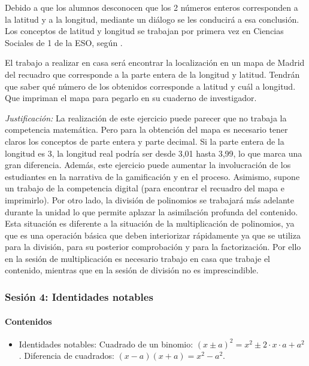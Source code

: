 Debido a que los alumnos desconocen que los 2 números enteros corresponden a la latitud y a la longitud, mediante un diálogo se les conducirá a esa conclusión.
%
Los conceptos de latitud y longitud se trabajan por primera vez en Ciencias Sociales de 1 de la ESO, según \bocm.


El trabajo a realizar en casa será encontrar la localización en un mapa de Madrid del recuadro que corresponde a la parte entera de la longitud y latitud.
%
Tendrán que saber qué número de los obtenidos corresponde a latitud y cuál a longitud.
%
Que impriman el mapa para pegarlo en su cuaderno de investigador.

\textit{
	Justificación:
}
%
La realización de este ejercicio puede parecer que no trabaja la competencia matemática. 
%
Pero para la obtención del mapa es necesario tener claros los conceptos de parte entera y parte decimal.
%
Si la parte entera de la longitud es 3, la longitud real podría ser desde 3,01 hasta 3,99, lo que marca una gran diferencia.
%
Además, este ejercicio puede aumentar la involucración de los estudiantes en la narrativa de la gamificación y en el proceso.
%
Asimismo, supone un trabajo de la competencia digital (para encontrar el recuadro del mapa e imprimirlo).
%
Por otro lado, la división de polinomios se trabajará más adelante durante la unidad lo que permite aplazar la asimilación profunda del contenido.
%
Esta situación es diferente a la situación de la multiplicación de polinomios, ya que es una operación básica que deben interiorizar rápidamente ya que se utiliza para la división, para su posterior comprobación y para la factorización.
%
Por ello en la sesión de multiplicación es necesario trabajo en casa que trabaje el contenido, mientras que en la sesión de división no es imprescindible.



\subsubsection{Sesión 4: Identidades notables}

\paragraph{Contenidos}
\begin{itemize}
	\item Identidades notables: 
	\subitem Cuadrado de un binomio: $(x\pm a)^2 = x^2\pm 2·x·a + a^2$.
	\subitem Diferencia de cuadrados: $(x-a)(x+a) = x^2-a^2$.
\end{itemize}

